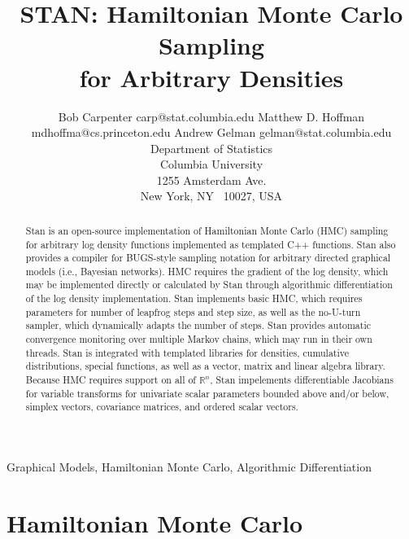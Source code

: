 \documentclass[twoside,11pt]{article}
\begin{document}
\title{STAN: Hamiltonian Monte Carlo Sampling \\ for Arbitrary Densities}

\author{\name Bob Carpenter \email carp@stat.columbia.edu
  \AND
  \name Matthew D. Hoffman \email mdhoffma@cs.princeton.edu
  \AND
  \name Andrew Gelman \email gelman@stat.columbia.edu
  \\
       \addr Department of Statistics\\
       Columbia University \\
       1255 Amsterdam Ave. \\
       New York, NY \ 10027, USA}


\maketitle

\begin{abstract}%
  Stan is an open-source implementation of Hamiltonian Monte Carlo
  (HMC) sampling for arbitrary log density functions implemented as
  templated C++ functions. Stan also provides a compiler for
  BUGS-style sampling notation for arbitrary directed graphical models
  (i.e., Bayesian networks). HMC requires the gradient of the log
  density, which may be implemented directly or calculated by Stan
  through algorithmic differentiation of the log density
  implementation. Stan implements basic HMC, which requires parameters
  for number of leapfrog steps and step size, as well as the no-U-turn
  sampler, which dynamically adapts the number of steps. Stan provides
  automatic convergence monitoring over multiple Markov chains, which
  may run in their own threads. Stan is integrated with templated
  libraries for densities, cumulative distributions, special
  functions, as well as a vector, matrix and linear algebra library.
  Because HMC requires support on all of ${\mathbb R}^n$, Stan
  impelements differentiable Jacobians for variable transforms for
  univariate scalar parameters bounded above and/or below, simplex
  vectors, covariance matrices, and ordered scalar vectors.
\end{abstract}

\begin{keywords}
  Graphical Models, Hamiltonian Monte Carlo, Algorithmic Differentiation
\end{keywords}

\section{Hamiltonian Monte Carlo}
\end{document}
